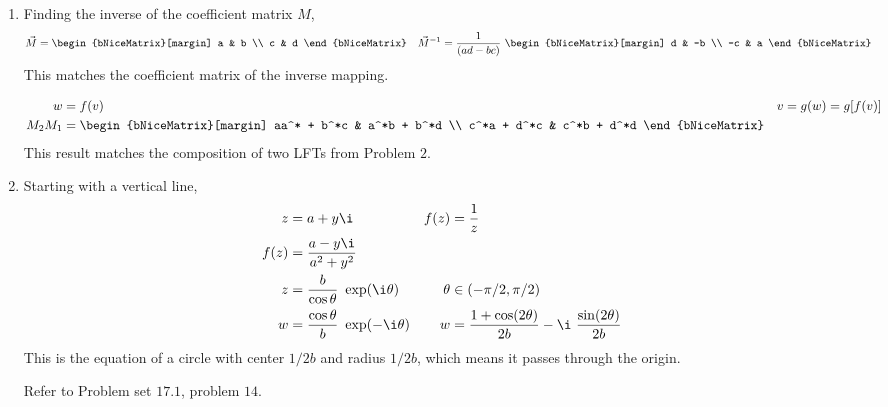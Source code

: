 \begin{enumerate}
    \item Finding the inverse of the coefficient matrix $ M $,
          \begin{align}
              \vec{M}      & = \begin{bNiceMatrix}[margin]
                                   a & b \\
                                   c & d
                               \end{bNiceMatrix}                       &
              \vec{M}^{-1} & =  \frac{1}{(ad - bc)}\ \begin{bNiceMatrix}[margin]
                                                         d  & -b \\
                                                         -c & a
                                                     \end{bNiceMatrix}
          \end{align}
          This matches the coefficient matrix of the inverse mapping. \par
          \begin{align}
              w      & = f(v)                        &
              v      & = g(w) = g[f(v)]                \\
              M_2M_1 & = \begin{bNiceMatrix}[margin]
                             aa^* + b^*c & a^*b + b^*d \\
                             c^*a + d^*c & c^*b + d^*d
                         \end{bNiceMatrix}
          \end{align}
          This result matches the composition of two LFTs from Problem $ 2 $.

    \item Starting with a vertical line,
          \begin{align}
              z      & = a + y\i                                                     &
              f(z)   & = \frac{1}{z}                                                   \\
              f(z)   & = \frac{a - y\i}{a^2 + y^2}                                     \\
              z      & = \frac{b}{\cos \theta}\ \exp(\i \theta)                      &
              \theta & \in (-\pi/2, \pi/2)                                             \\
              w      & = \frac{\cos \theta}{b}\ \exp(-\i \theta)                     &
              w      & = \frac{1 + \cos(2\theta)}{2b} - \i\ \frac{\sin(2\theta)}{2b}
          \end{align}
          This is the equation of a circle with center $ 1/2b $ and radius $ 1/2b $,
          which means it passes through the origin. \par
          Refer to Problem set $ 17.1 $, problem $ 14 $.


\end{enumerate}

